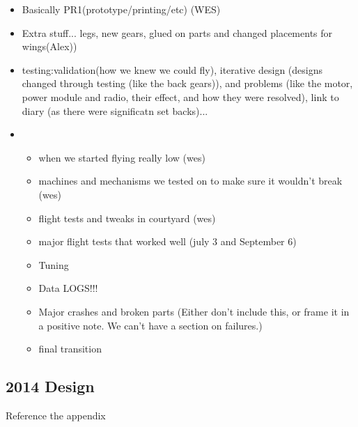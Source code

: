 \color{red}
\begin{itemize}
\item Basically PR1(prototype/printing/etc) (WES)
\item Extra stuff... legs, new gears, glued on parts and changed placements for wings(Alex))
\item testing:validation(how we knew we could fly), iterative design (designs changed through testing (like the back gears)), and problems (like the motor, power module and radio, their effect, and how they were resolved), link to diary (as there were significatn set backs)... 
\item \begin{itemize}
	\item when we started flying really low (wes) 
	\item machines and mechanisms we tested on to make sure it wouldn’t break (wes) 
	\item flight tests and tweaks in courtyard (wes) 
	\item major flight tests that worked well (july 3 and September 6) 
	\item Tuning 
	\item Data LOGS!!! 
	\item Major crashes and broken parts (Either don't include this, or frame it in a positive note. We can't have a section on failures.)
	\item final transition
\end{itemize}
\end{itemize}
\color{black}

\subsection{2014 Design}
Reference the appendix 

